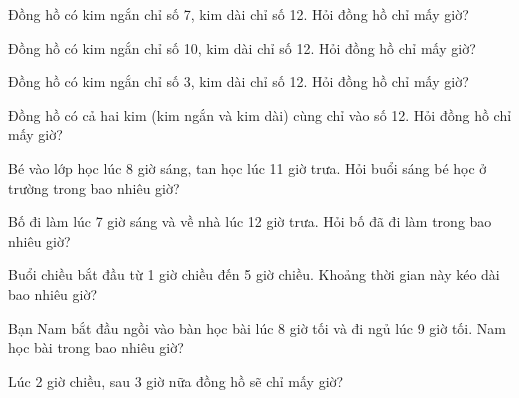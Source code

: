 \begin{ex}
Đồng hồ có kim ngắn chỉ số 7, kim dài chỉ số 12. Hỏi đồng hồ chỉ mấy giờ?
\end{ex}

\begin{ex}
Đồng hồ có kim ngắn chỉ số 10, kim dài chỉ số 12. Hỏi đồng hồ chỉ mấy giờ?
\end{ex}

\begin{ex}
Đồng hồ có kim ngắn chỉ số 3, kim dài chỉ số 12. Hỏi đồng hồ chỉ mấy giờ?
\end{ex}

\begin{ex}
Đồng hồ có cả hai kim (kim ngắn và kim dài) cùng chỉ vào số 12. Hỏi đồng hồ chỉ mấy giờ?
\end{ex}

\begin{ex}
Bé vào lớp học lúc 8 giờ sáng, tan học lúc 11 giờ trưa. Hỏi buổi sáng bé học ở trường trong bao nhiêu giờ?
\end{ex}

\begin{ex}
Bố đi làm lúc 7 giờ sáng và về nhà lúc 12 giờ trưa. Hỏi bố đã đi làm trong bao nhiêu giờ?
\end{ex}

\begin{ex}
Buổi chiều bắt đầu từ 1 giờ chiều đến 5 giờ chiều. Khoảng thời gian này kéo dài bao nhiêu giờ?
\end{ex}

\begin{ex}
Bạn Nam bắt đầu ngồi vào bàn học bài lúc 8 giờ tối và đi ngủ lúc 9 giờ tối. Nam học bài trong bao nhiêu giờ?
\end{ex}

\begin{ex}
Lúc 2 giờ chiều, sau 3 giờ nữa đồng hồ sẽ chỉ mấy giờ?
\end{ex}

